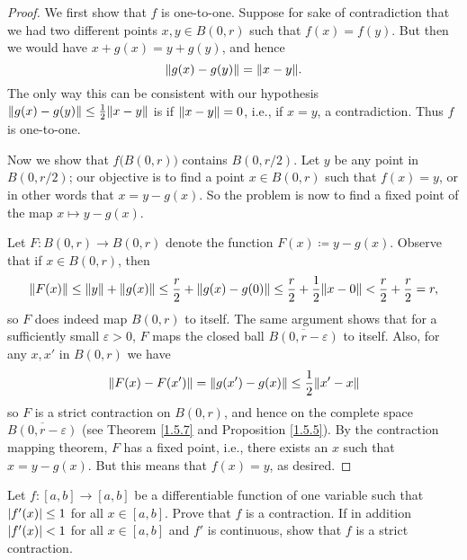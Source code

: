 \begin{proof}
    We first show that \(f\) is one-to-one.
    Suppose for sake of contradiction that we had two different points \(x, y \in B(0, r)\) such that \(f(x) = f(y)\).
    But then we would have \(x + g(x) = y + g(y)\), and hence
    \[
        \norm*{g(x) - g(y)} = \norm*{x - y}.
    \]
    The only way this can be consistent with our hypothesis \(\norm*{g(x) - g(y)} \leq \frac{1}{2} \norm*{x - y}\) is if \(\norm*{x - y} = 0\), i.e., if \(x = y\), a contradiction.
    Thus \(f\) is one-to-one.

    Now we show that \(f\big(B(0, r)\big)\) contains \(B(0, r / 2)\).
    Let \(y\) be any point in \(B(0, r / 2)\);
    our objective is to find a point \(x \in B(0, r)\) such that \(f(x) = y\), or in other words that \(x = y - g(x)\).
    So the problem is now to find a fixed point of the map \(x \mapsto y - g(x)\).

    Let \(F : B(0, r) \to B(0, r)\) denote the function \(F(x) \coloneqq y - g(x)\).
    Observe that if \(x \in B(0, r)\), then
    \[
        \norm*{F(x)} \leq \norm*{y} + \norm*{g(x)} \leq \frac{r}{2} + \norm*{g(x) - g(0)} \leq \frac{r}{2} + \frac{1}{2} \norm*{x - 0} < \frac{r}{2} + \frac{r}{2} = r,
    \]
    so \(F\) does indeed map \(B(0, r)\) to itself.
    The same argument shows that for a sufficiently small \(\varepsilon > 0\), \(F\) maps the closed ball \(\overline{B(0, r - \varepsilon)}\) to itself.
    Also, for any \(x, x'\) in \(B(0, r)\) we have
    \[
        \norm*{F(x) - F(x')} = \norm*{g(x') - g(x)} \leq \frac{1}{2} \norm*{x' - x}
    \]
    so \(F\) is a strict contraction on \(B(0, r)\), and hence on the complete space \(\overline{B(0, r - \varepsilon)}\) (see Theorem \ref{1.5.7} and Proposition \ref{1.5.5}).
    By the contraction mapping theorem, \(F\) has a fixed point, i.e., there exists an \(x\) such that \(x = y - g(x)\).
    But this means that \(f(x) = y\), as desired.
\end{proof}

\exercisesection

\begin{exercise}\label{ex 6.6.1}
    Let \(f : [a, b] \to [a, b]\) be a differentiable function of one variable such that \(\abs{f'(x)} \leq 1\) for all \(x \in [a, b]\).
    Prove that \(f\) is a contraction.
    If in addition \(\abs{f'(x)} < 1\) for all \(x \in [a, b]\) and \(f'\) is continuous, show that \(f\) is a strict contraction.
\end{exercise}

